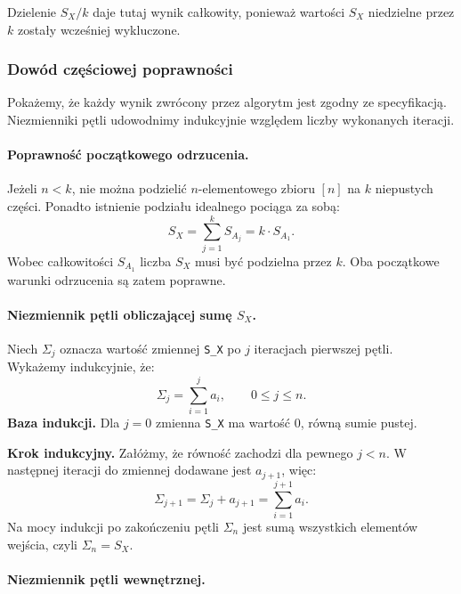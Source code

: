\documentclass[11pt]{article}
\newcommand{\bazaind}{\noindent \textbf{Baza indukcji. }}
\newcommand{\krokind}{\noindent \textbf{Krok indukcyjny. }}
\begin{document}
Dzielenie \(S_X/k\) daje tutaj wynik całkowity, ponieważ wartości \(S_X\) niedzielne przez \(k\) zostały wcześniej wykluczone.

\subsubsection{Dowód częściowej poprawności}

Pokażemy, że każdy wynik zwrócony przez algorytm jest zgodny ze specyfikacją. Niezmienniki pętli udowodnimy indukcyjnie względem liczby wykonanych iteracji.

\paragraph{Poprawność początkowego odrzucenia.}

Jeżeli \(n<k\), nie można podzielić \(n\)-elementowego zbioru \([n]\) na \(k\) niepustych części. Ponadto istnienie podziału idealnego pociąga za sobą:
\begin{equation}
S_X=\sum_{j=1}^{k}S_{A_j}=k\cdot S_{A_1}.
\end{equation}
Wobec całkowitości \(S_{A_1}\) liczba \(S_X\) musi być podzielna przez \(k\). Oba początkowe warunki odrzucenia są zatem poprawne.

\paragraph{Niezmiennik pętli obliczającej sumę \(S_X\).}

Niech \(\Sigma_j\) oznacza wartość zmiennej \texttt{S\_X} po \(j\) iteracjach pierwszej pętli. Wykażemy indukcyjnie, że:
\begin{equation}
\Sigma_j=\sum_{i=1}^{j}a_i, \qquad 0\leq j\leq n.
\end{equation}
\bazaind Dla \(j=0\) zmienna \texttt{S\_X} ma wartość \(0\), równą sumie pustej.

\krokind Załóżmy, że równość zachodzi dla pewnego \(j<n\). W następnej iteracji do zmiennej dodawane jest \(a_{j+1}\), więc:
\begin{equation}
\Sigma_{j+1}=\Sigma_j+a_{j+1}=\sum_{i=1}^{j+1}a_i.
\end{equation}
Na mocy indukcji po zakończeniu pętli \(\Sigma_n\) jest sumą wszystkich elementów wejścia, czyli \(\Sigma_n=S_X\).

\paragraph{Niezmiennik pętli wewnętrznej.}
\end{document}
